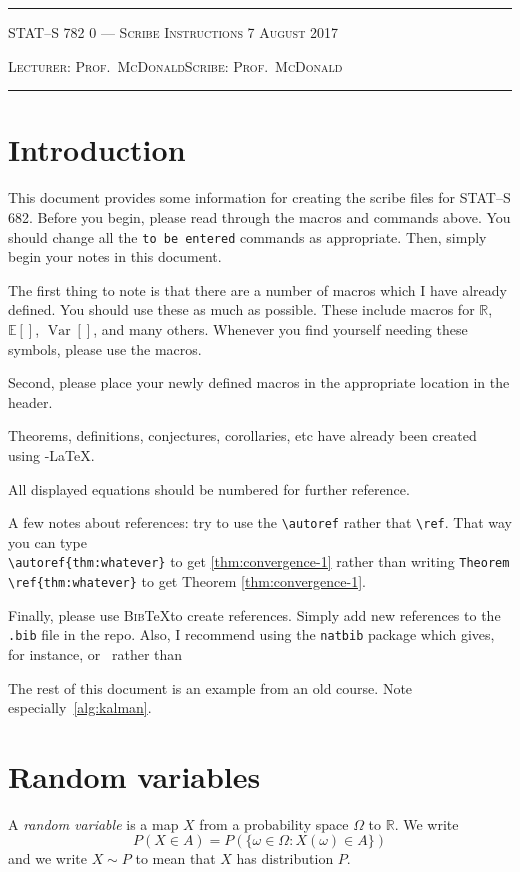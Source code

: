 \documentclass[10pt]{article}
\newcommand{\Expect}[1]{\mathbb{E}\!\left[#1\right]}
\newcommand{\R}{\mathbb{R}}
\DeclareMathOperator*{\Variance}{Var}
\newcommand{\Var}[1]{\Variance\!\left[#1\right]}
\newcommand{\lecturer}{Prof.\ McDonald}
\newcommand{\scribe}{Prof.\ McDonald}
\newcommand{\chtitle}{Scribe Instructions}
\newcommand{\lecdate}{7 August 2017}
\begin{document}
\rule{6.5in}{1pt}

\textsc{STAT--S 782
        \hfill 0 --- \chtitle
        \hfill \lecdate}

\textsc{Lecturer: \lecturer \hfill Scribe: \scribe}
\rule{6.5in}{1pt}



\section*{Introduction}

This document provides some information for creating the scribe files
for STAT--S 682. Before you begin, please read through the macros and
commands above. You should change all the {\tt to be entered} commands
as appropriate. Then, simply begin your notes in this document. 

The first thing to note is that there are a number of
macros which I have already defined. You should use these as much as
possible. These include macros for $\R$, $\Expect{}$, $\Var{}$, and
many others. Whenever you find yourself needing these symbols, please
use the macros.

Second, please place your newly defined macros in the appropriate
location in the header.

Theorems, definitions, conjectures, corollaries, etc have already been
created using \AmS-\LaTeX.

All displayed equations should be numbered for further reference. 

A few notes about references: try to use the \verb|\autoref| rather
that \verb|\ref|. That way you can type \\ \verb|\autoref{thm:whatever}|
to get \autoref{thm:convergence-1} rather than writing \verb|Theorem \ref{thm:whatever}| 
to get Theorem \ref{thm:convergence-1}. 

Finally, please use \textsc{Bib}\TeX to create references. Simply add
new references to the {\tt .bib} file in the repo. Also, I recommend
using the {\tt natbib} package which gives, for instance,
\citep{Vapnik1998} or~\citet{Vapnik1998} rather than~\cite{Vapnik1998}

The rest of this document is an example from an old course. Note
especially~\autoref{alg:kalman}.

\section{Random variables}


A {\em random variable} is a map $X$ from a probability space $\Omega$ to $\R$. We write
\begin{equation}
  P(X\in A)=P(\{\omega\in\Omega : X(\omega)\in A\})\label{eq:1}
\end{equation}
and we write $X \sim P$ to mean that $X$ has distribution $P$. 
\end{document}
